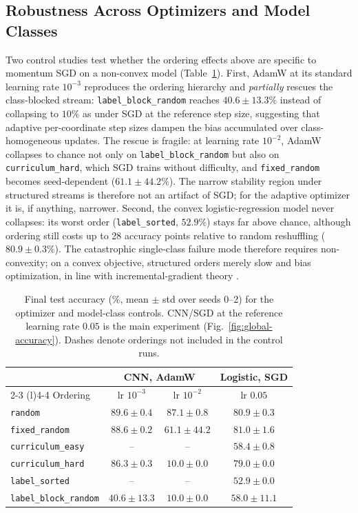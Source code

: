 \documentclass[conference]{IEEEtran}
\begin{document}
\subsection{Robustness Across Optimizers and Model Classes}
\label{sec:robustness}
Two control studies test whether the ordering effects above are specific
to momentum SGD on a non-convex model (Table~\ref{tab:robustness}).
First, AdamW at its standard learning rate $10^{-3}$ reproduces the
ordering hierarchy and \emph{partially} rescues the class-blocked stream:
\texttt{label\_block\_random} reaches $40.6\pm13.3\%$ instead of
collapsing to $10\%$ as under SGD at the reference step size, suggesting
that adaptive per-coordinate step sizes dampen the bias accumulated over
class-homogeneous updates.
The rescue is fragile: at learning rate $10^{-2}$, AdamW collapses to
chance not only on \texttt{label\_block\_random} but also on
\texttt{curriculum\_hard}, which SGD trains without difficulty, and
\texttt{fixed\_random} becomes seed-dependent ($61.1\pm44.2\%$).
The narrow stability region under structured streams is therefore not an
artifact of SGD; for the adaptive optimizer it is, if anything, narrower.
Second, the convex logistic-regression model never collapses: its worst
order (\texttt{label\_sorted}, $52.9\%$) stays far above chance, although
ordering still costs up to 28 accuracy points relative to random
reshuffling ($80.9\pm0.3\%$).
The catastrophic single-class failure mode therefore requires
non-convexity; on a convex objective, structured orders merely slow and
bias optimization, in line with incremental-gradient theory
\cite{bottou2018,gurbuzbalaban2021}.

\begin{table}[!t]
  \centering
  \caption{Final test accuracy (\%, mean $\pm$ std over seeds 0--2) for the
  optimizer and model-class controls. CNN/SGD at the reference learning
  rate $0.05$ is the main experiment (Fig.~\ref{fig:global-accuracy}).
  Dashes denote orderings not included in the control runs.}
  \label{tab:robustness}
  \begin{tabular}{@{}lccc@{}}
    \toprule
    & \multicolumn{2}{c}{CNN, AdamW} & Logistic, SGD \\
    \cmidrule(lr){2-3} \cmidrule(l){4-4}
    Ordering & lr $10^{-3}$ & lr $10^{-2}$ & lr $0.05$ \\
    \midrule
    \texttt{random}             & $89.6\pm0.4$  & $87.1\pm0.8$   & $80.9\pm0.3$ \\
    \texttt{fixed\_random}      & $88.6\pm0.2$  & $61.1\pm44.2$  & $81.0\pm1.6$ \\
    \texttt{curriculum\_easy}   & --            & --             & $58.4\pm0.8$ \\
    \texttt{curriculum\_hard}   & $86.3\pm0.3$  & $10.0\pm0.0$   & $79.0\pm0.0$ \\
    \texttt{label\_sorted}      & --            & --             & $52.9\pm0.0$ \\
    \texttt{label\_block\_random} & $40.6\pm13.3$ & $10.0\pm0.0$ & $58.0\pm11.1$ \\
    \bottomrule
  \end{tabular}
\end{table}
\FloatBarrier
\end{document}
